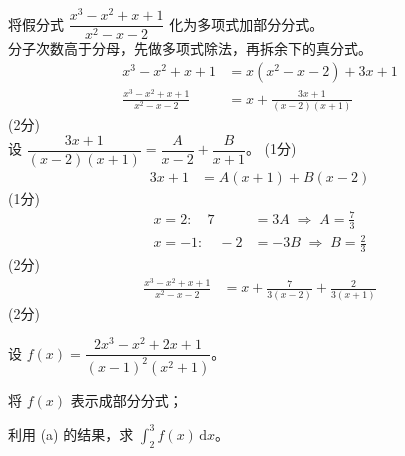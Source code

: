 \documentclass{exam-zh}
\newcommand{\qscoreoffset}{4em}
\newcommand{\qscore}[2][\%]{%
    \leavevmode\unskip\nobreak\hfill
    \makebox[0pt][l]{\makebox[\qscoreoffset][r]{(#2#1)}}%
}
\begin{document}
\begin{solution}
    将假分式 $\dfrac{x^3-x^2+x+1}{x^2-x-2}$ 化为多项式加部分分式。 \\
    分子次数高于分母，先做多项式除法，再拆余下的真分式。
    \begin{align*}
        x^3-x^2+x+1 &= x(x^2-x-2)+3x+1 \\
        \frac{x^3-x^2+x+1}{x^2-x-2} &= x+\frac{3x+1}{(x-2)(x+1)}
    \end{align*}
    \hfill (2分) \\
    设 $\dfrac{3x+1}{(x-2)(x+1)}=\dfrac{A}{x-2}+\dfrac{B}{x+1}$。
    \hfill (1分)
    \begin{align*}
        3x+1 &= A(x+1)+B(x-2)
    \end{align*}
    \hfill (1分) \\
    \begin{align*}
        x=2:\quad 7 &= 3A \;\Rightarrow\; A=\frac73 \\
        x=-1:\quad -2 &= -3B \;\Rightarrow\; B=\frac23
    \end{align*}
    \hfill (2分) \\
    \begin{align*}
        \frac{x^3-x^2+x+1}{x^2-x-2} &= x+\frac{7}{3(x-2)}+\frac{2}{3(x+1)}
    \end{align*}
    \hfill (2分)
\end{solution}

\begin{question}[points = 10]
    设 $f(x)=\dfrac{2x^3-x^2+2x+1}{(x-1)^2(x^2+1)}$。

    \begin{questionparts}
        \item 将 $f(x)$ 表示成部分分式； \qscore{6}

        \item 利用 (a) 的结果，求 $\displaystyle\int_2^3 f(x)\,\mathrm{d}x$。 \qscore{4}
    \end{questionparts}
\end{question}
\end{document}
